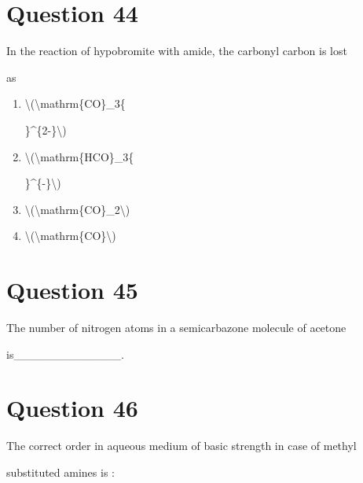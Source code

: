 \documentclass{article}
\begin{document}
\section*{Question 44}
In the reaction of hypobromite with amide, the carbonyl carbon is lost

as


\begin{enumerate}[label=(\alph*)]
\item \textbackslash(\textbackslash mathrm\{CO\}\_3\{

\}\^{}\{2-\}\textbackslash)


\item \textbackslash(\textbackslash mathrm\{HCO\}\_3\{

\}\^{}\{-\}\textbackslash)


\item \textbackslash(\textbackslash mathrm\{CO\}\_2\textbackslash)


\item \textbackslash(\textbackslash mathrm\{CO\}\textbackslash)


\end{enumerate}
\newpage
\section*{Question 45}
The number of nitrogen atoms in a semicarbazone molecule of acetone

is\_\_\_\_\_\_\_\_\_\_\_\_\_.


\begin{enumerate}[label=(\alph*)]
\end{enumerate}
\newpage
\section*{Question 46}
The correct order in aqueous medium of basic strength in case of methyl

substituted amines is :
\end{document}
